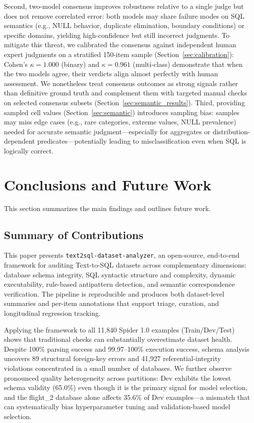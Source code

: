 \documentclass[]{einformatica}
\begin{document}
Second, two-model consensus improves robustness relative to a single judge but does not remove correlated error: both models may share failure modes on SQL semantics (e.g., NULL behavior, duplicate elimination, boundary conditions) or specific domains, yielding high-confidence but still incorrect judgments. To mitigate this threat, we calibrated the consensus against independent human expert judgments on a stratified 150-item sample (Section~\ref{sec:calibration}): Cohen's $\kappa = 1.000$ (binary) and $\kappa = 0.961$ (multi-class) demonstrate that when the two models agree, their verdicts align almost perfectly with human assessment. We nonetheless treat consensus outcomes as strong signals rather than definitive ground truth and complement them with targeted manual checks on selected consensus subsets (Section~\ref{sec:semantic_results}). Third, providing sampled cell values (Section~\ref{sec:semantic}) introduces sampling bias: samples may miss edge cases (e.g., rare categories, extreme values, NULL prevalence) needed for accurate semantic judgment---especially for aggregates or distribution-dependent predicates---potentially leading to misclassification even when SQL is logically correct.

\section{Conclusions and Future Work}\label{sec:Conclusions}

This section summarizes the main findings and outlines future work.

\subsection{Summary of Contributions}

This paper presents \texttt{text2sql-dataset-analyzer}, an open-source, end-to-end framework for auditing Text-to-SQL datasets across complementary dimensions: database schema integrity, SQL syntactic structure and complexity, dynamic executability, rule-based antipattern detection, and semantic correspondence verification. The pipeline is reproducible and produces both dataset-level summaries and per-item annotations that support triage, curation, and longitudinal regression tracking.

Applying the framework to all 11,840 Spider 1.0 examples (Train/Dev/Test) shows that traditional checks can substantially overestimate dataset health. Despite 100\% parsing success and 99.97--100\% execution success, schema analysis uncovers 89 structural foreign-key errors and 41,927 referential-integrity violations concentrated in a small number of databases. We further observe pronounced quality heterogeneity across partitions: Dev exhibits the lowest schema validity (65.0\%) even though it is the primary signal for model selection, and the flight\_2 database alone affects 35.6\% of Dev examples---a mismatch that can systematically bias hyperparameter tuning and validation-based model selection.
\end{document}
